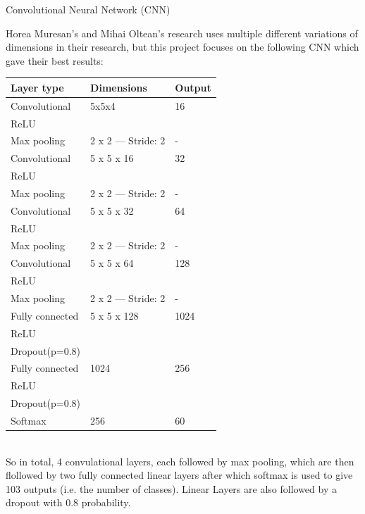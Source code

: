 \documentclass[article,11pt]{article}
\begin{document}
\begin{definition}{{\small Convolutional Neural Network (CNN)}}{}

    Horea Muresan's and Mihai Oltean's research uses multiple different variations of dimensions in their research,
    but this project focuses on the following CNN which gave their best results:\\

    \begin{tabular}{| l | l | l |}
        \hline
        \bf Layer type & \bf Dimensions & \bf Output \\
        \hline			
        Convolutional & 5x5x4 & 16 \\
        ReLU & & \\
        Max pooling & 2 x 2 — Stride: 2 & - \\
        Convolutional & 5 x 5 x 16 & 32 \\
        ReLU & & \\
        Max pooling & 2 x 2 — Stride: 2 & - \\
        Convolutional & 5 x 5 x 32 & 64 \\
        ReLU & & \\
        Max pooling & 2 x 2 — Stride: 2 & - \\
        Convolutional & 5 x 5 x 64 & 128 \\
        ReLU & & \\
        Max pooling & 2 x 2 — Stride: 2 & - \\
        Fully connected & 5 x 5 x 128 & 1024 \\
        ReLU & & \\
        Dropout(p=0.8) & & \\
        Fully connected & 1024 & 256 \\
        ReLU & & \\
        Dropout(p=0.8) & & \\
        Softmax & 256 & 60 \\
        \hline  
    \end{tabular}\\

    So in total, 4 convulational layers, each followed by max pooling, which are then flollowed by two fully connected
    linear layers after which softmax is used to give 103 outputs (i.e. the number of classes). Linear Layers are also followed by a dropout with 0.8 probability.
\end{definition}
\end{document}
